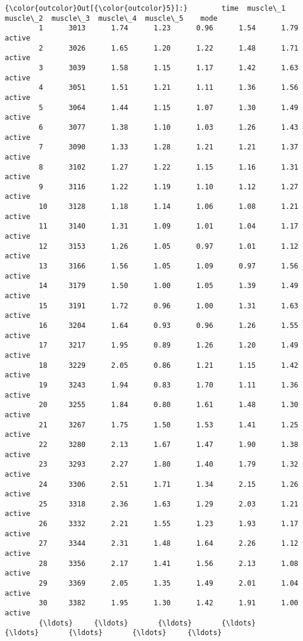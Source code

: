 \documentclass[11pt]{article}
\begin{document}
\begin{Verbatim}[commandchars=\\\{\}]
{\color{outcolor}Out[{\color{outcolor}5}]:}        time  muscle\_1  muscle\_2  muscle\_3  muscle\_4  muscle\_5    mode
        1      3013      1.74      1.23      0.96      1.54      1.79  active
        2      3026      1.65      1.20      1.22      1.48      1.71  active
        3      3039      1.58      1.15      1.17      1.42      1.63  active
        4      3051      1.51      1.21      1.11      1.36      1.56  active
        5      3064      1.44      1.15      1.07      1.30      1.49  active
        6      3077      1.38      1.10      1.03      1.26      1.43  active
        7      3090      1.33      1.28      1.21      1.21      1.37  active
        8      3102      1.27      1.22      1.15      1.16      1.31  active
        9      3116      1.22      1.19      1.10      1.12      1.27  active
        10     3128      1.18      1.14      1.06      1.08      1.21  active
        11     3140      1.31      1.09      1.01      1.04      1.17  active
        12     3153      1.26      1.05      0.97      1.01      1.12  active
        13     3166      1.56      1.05      1.09      0.97      1.56  active
        14     3179      1.50      1.00      1.05      1.39      1.49  active
        15     3191      1.72      0.96      1.00      1.31      1.63  active
        16     3204      1.64      0.93      0.96      1.26      1.55  active
        17     3217      1.95      0.89      1.26      1.20      1.49  active
        18     3229      2.05      0.86      1.21      1.15      1.42  active
        19     3243      1.94      0.83      1.70      1.11      1.36  active
        20     3255      1.84      0.80      1.61      1.48      1.30  active
        21     3267      1.75      1.50      1.53      1.41      1.25  active
        22     3280      2.13      1.67      1.47      1.90      1.38  active
        23     3293      2.27      1.80      1.40      1.79      1.32  active
        24     3306      2.51      1.71      1.34      2.15      1.26  active
        25     3318      2.36      1.63      1.29      2.03      1.21  active
        26     3332      2.21      1.55      1.23      1.93      1.17  active
        27     3344      2.31      1.48      1.64      2.26      1.12  active
        28     3356      2.17      1.41      1.56      2.13      1.08  active
        29     3369      2.05      1.35      1.49      2.01      1.04  active
        30     3382      1.95      1.30      1.42      1.91      1.00  active
        {\ldots}     {\ldots}       {\ldots}       {\ldots}       {\ldots}       {\ldots}       {\ldots}     {\ldots}

\end{Verbatim}
\end{document}
